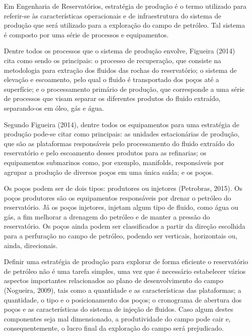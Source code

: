 Em Engenharia de Reservatórios, estratégia de produção é o termo utilizado para referir-se às características operacionais e de infraestrutura do sistema de produção que será utilizado para a exploração do campo de petróleo. Tal sistema é composto por uma série de processos e equipamentos. 

Dentre todos os processos que o sistema de produção envolve, Figueira (2014) cita como sendo os principais: o processo de recuperação, que consiste na metodologia para extração dos fluidos das rochas do reservatório; o sistema de elevação e escoamento, pelo qual o fluido é transportado dos poços até a superfície; e o processamento primário de produção, que corresponde a uma série de processos que visam separar os diferentes produtos do fluido extraído, separando-os em óleo, gás e água. 

Segundo Figueira (2014), dentre todos os equipamentos para uma estratégia de produção pode-se citar como principais: as unidades estacionárias de produção, que são as plataformas responsáveis pelo processamento do fluido extraído do reservatório e pelo escoamento desses produtos para as refinarias; os equipamentos submarinos como, por exemplo, manifolds, responsáveis por agrupar a produção de diversos poços em uma única saída;  e os poços.

Os poços podem ser de dois tipos: produtores ou injetores (Petrobras, 2015). Os poços produtores são os equipamentos responsáveis por drenar o petróleo do reservatório. Já os poços injetores, injetam algum tipo de fluido, como água ou gás, a fim melhorar a drenagem do petróleo e de manter a pressão do reservatório. Os poços ainda podem ser classificados a partir da direção escolhida para a perfuração no campo de petróleo, podendo ser verticais, horizontais ou, ainda, direcionais.

Definir uma estratégia de produção para explorar de forma eficiente o reservatório de petróleo não é uma tarefa simples, uma vez que é necessário estabelecer vários aspectos importantes relacionados ao plano de desenvolvimento do campo (Nogueira, 2009), tais como a quantidade e as características das plataformas; a quantidade, o tipo e o posicionamento dos poços; o cronograma de abertura dos poços e as características do sistema de injeção de fluidos. Caso algum destes componentes seja mal dimensionado, a produtividade do campo pode cair e, consequentemente, o lucro final da exploração do campo será prejudicado.

